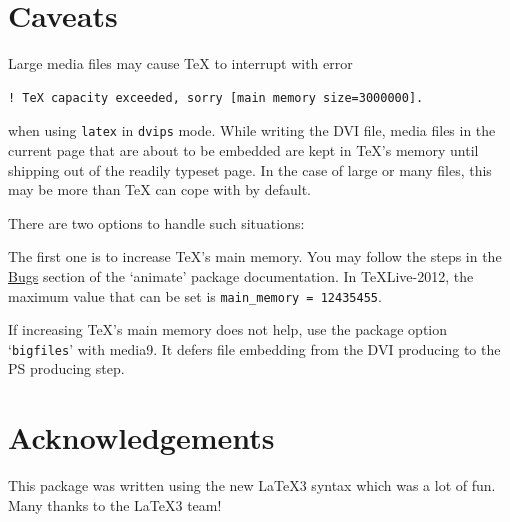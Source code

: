 \documentclass[a4paper]{article}
\begin{document}
\section{Caveats}\label{bugs}
Large media files may cause \TeX{} to interrupt with error
\begin{verbatim}
! TeX capacity exceeded, sorry [main memory size=3000000].
\end{verbatim}
when using \verb+latex+ in \verb+dvips+ mode. While writing the DVI file, media files in the current page that are about to be embedded are kept in \TeX's memory until shipping out of the readily typeset page. In the case of large or many files, this may be more than \TeX{} can cope with by default.

There are two options to handle such situations:

The first one is to increase \TeX's main memory. You may follow the steps in the \href{http://mirror.ctan.org/macros/latex/contrib/animate/animate.pdf\#dest:mem}{Bugs} section of the `animate' package documentation. In \TeX{}Live-2012, the maximum value that can be set is \verb+main_memory = 12435455+.

If increasing \TeX's main memory does not help, use the package option `\verb+bigfiles+' with media9. It defers file embedding from the DVI producing to the PS producing step.

\section{Acknowledgements}
This package was written using the new \LaTeX3 syntax which was a lot of fun. Many thanks to the \LaTeX3 team!
\end{document}
